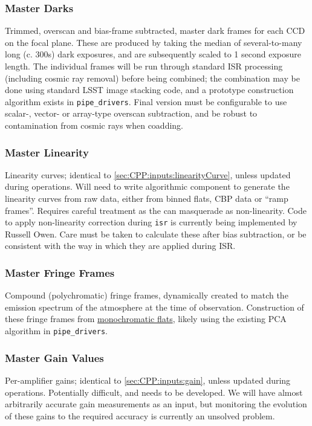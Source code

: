 \subsubsection{Master Darks}\label{sec:CPP:output:dark}
Trimmed, overscan and bias-frame subtracted, master dark frames for each CCD on the focal plane. These are produced by taking the median of several-to-many long (c. 300s) dark exposures, and are subsequently scaled to 1 second exposure length.  
\alg The individual frames will be run through standard ISR processing (including cosmic ray removal) before
being combined; the combination may be done using standard LSST image stacking code, and a prototype construction algorithm exists in \texttt{pipe\_drivers}. Final version must be configurable to use scalar-, vector- or array-type overscan subtraction, and be robust to contamination from cosmic rays when coadding.


\subsubsection{Master Linearity}\label{sec:CPP:output:linearityCurve}
Linearity curves; identical to \secsymbol\ref{sec:CPP:inputs:linearityCurve}, unless updated during operations.
\alg Will need to write algorithmic component to generate the linearity curves from raw data, either from binned flats, CBP data or ``ramp frames''. Requires careful treatment as the \bfeffect can masquerade as non-linearity. Code to apply non-linearity correction during \texttt{isr} is currently being implemented by Russell Owen. Care must be taken to calculate these after bias subtraction, or be consistent with the way in which they are applied during ISR.


\subsubsection{Master Fringe Frames}\label{sec:CPP:output:fringeFrames}
Compound (polychromatic) fringe frames, dynamically created to match the emission spectrum of the atmosphere at the time of observation.
\alg Construction of these fringe frames from \hyperref[sec:CPP:output:monoPhotoFlat]{monochromatic flats}, likely using the existing PCA algorithm in \texttt{pipe\_drivers}.


\subsubsection{Master Gain Values}\label{sec:CPP:output:gains}
Per-amplifier gains; identical to \secsymbol\ref{sec:CPP:inputs:gain}, unless updated during operations.
\alg Potentially difficult, and needs to be developed. We will have almost arbitrarily accurate gain measurements as an input, but monitoring the evolution of these gains to the required accuracy is currently an unsolved problem.

